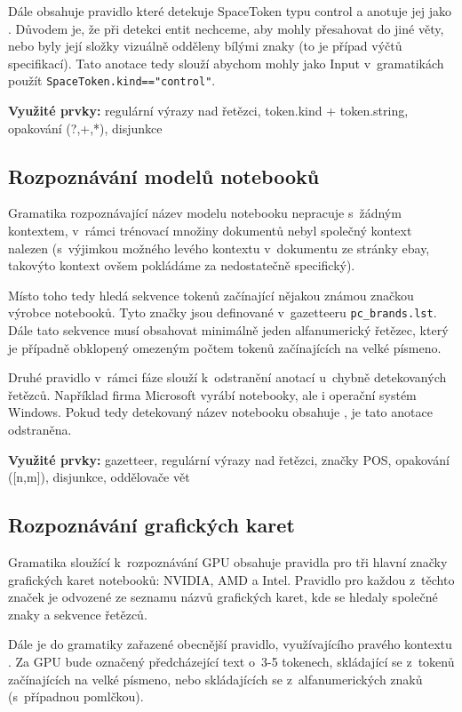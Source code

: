 \documentclass[a4,12pt]{article}
\let\Oldsubsection\subsection
\renewcommand{\subsection}{\FloatBarrier\Oldsubsection}
\begin{document}
Dále obsahuje pravidlo které detekuje SpaceToken typu control a anotuje jej jako . Důvodem je, že při detekci entit nechceme, aby mohly přesahovat do jiné věty, nebo byly její složky vizuálně odděleny bílými znaky (to je případ výčtů specifikací). Tato anotace tedy slouží abychom mohly jako Input v~gramatikách použít \texttt{SpaceToken.kind=="control"}.

\textbf{Využité prvky:} regulární výrazy nad řetězci, token.kind + token.string, opakování (?,+,*), disjunkce
\subsection{Rozpoznávání modelů notebooků}
Gramatika rozpoznávající název modelu notebooku nepracuje s~žádným kontextem, v~rámci trénovací množiny dokumentů nebyl společný kontext nalezen (s~výjimkou možného levého kontextu  v~dokumentu ze stránky ebay, takovýto kontext ovšem pokládáme za nedostatečně specifický). 

Místo toho tedy hledá sekvence tokenů začínající nějakou známou značkou výrobce notebooků. Tyto značky jsou definované v~gazetteeru \texttt{pc\_brands.lst}. Dále tato sekvence musí obsahovat minimálně jeden alfanumerický řetězec, který je případně obklopený omezeným počtem tokenů začínajících na velké písmeno.

Druhé pravidlo v~rámci fáze slouží k~odstranění anotací u~chybně detekovaných řetězců. Například firma Microsoft vyrábí notebooky, ale i operační systém Windows. Pokud tedy detekovaný název notebooku obsahuje , je tato anotace odstraněna.

\textbf{Využité prvky:} gazetteer, regulární výrazy nad řetězci, značky POS, opakování ([n,m]), disjunkce, oddělovače vět 
\subsection{Rozpoznávání grafických karet}
Gramatika sloužící k~rozpoznávání GPU obsahuje pravidla pro tři hlavní značky grafických karet notebooků: NVIDIA, AMD a Intel. Pravidlo pro každou z~těchto značek je odvozené ze seznamu názvů grafických karet, kde se hledaly společné znaky a sekvence řetězců.

Dále je do gramatiky zařazené obecnější pravidlo, využívajícího pravého kontextu . Za GPU bude označený předcházející text o~3-5 tokenech, skládající se z~tokenů začínajících na velké písmeno, nebo skládajících se z~alfanumerických znaků (s~případnou pomlčkou).
\end{document}
